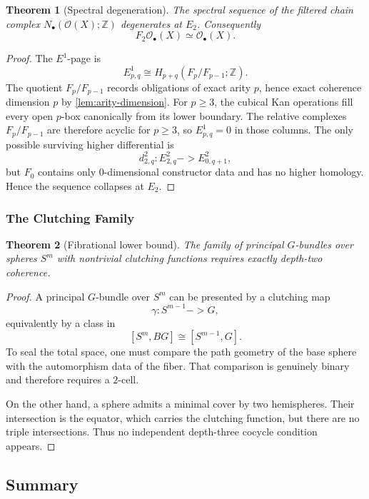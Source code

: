 \documentclass[11pt,a4paper]{article}
\def\to{->}%
\theoremstyle{plain}
\newtheorem{theorem}{Theorem}[section]
\theoremstyle{definition}
\theoremstyle{remark}
\newcommand{\Z}{\mathbb{Z}}
\newcommand{\Ocal}{\mathcal{O}}
\begin{document}
\begin{theorem}[Spectral degeneration]
\label{thm:spectral}
The spectral sequence of the filtered chain complex $N_\bullet(\Ocal(X);\Z)$ degenerates at $E_2$.  Consequently
\[
  F_2\Ocal_\bullet(X)\simeq \Ocal_\bullet(X).
\]
\end{theorem}

\begin{proof}
The $E^1$-page is
\[
  E^1_{p,q}\cong H_{p+q}(F_p/F_{p-1};\Z).
\]
The quotient $F_p/F_{p-1}$ records obligations of exact arity $p$, hence exact coherence dimension $p$ by \cref{lem:arity-dimension}.  For $p\ge 3$, the cubical Kan operations fill every open $p$-box canonically from its lower boundary.  The relative complexes $F_p/F_{p-1}$ are therefore acyclic for $p\ge 3$, so $E^1_{p,q}=0$ in those columns.  The only possible surviving higher differential is
\[
  d^2_{2,q}:E^2_{2,q}\to E^2_{0,q+1},
\]
but $F_0$ contains only $0$-dimensional constructor data and has no higher homology.  Hence the sequence collapses at $E_2$.
\end{proof}

\subsubsection{The Clutching Family}

\begin{theorem}[Fibrational lower bound]
\label{thm:clutching}
The family of principal $G$-bundles over spheres $S^m$ with nontrivial clutching functions requires exactly depth-two coherence.
\end{theorem}

\begin{proof}
A principal $G$-bundle over $S^m$ can be presented by a clutching map
\[
  \gamma:S^{m-1}\to G,
\]
equivalently by a class in
\[
  [S^m,BG]\cong [S^{m-1},G].
\]
To seal the total space, one must compare the path geometry of the base sphere with the automorphism data of the fiber.  That comparison is genuinely binary and therefore requires a $2$-cell.

On the other hand, a sphere admits a minimal cover by two hemispheres.  Their intersection is the equator, which carries the clutching function, but there are no triple intersections.  Thus no independent depth-three cocycle condition appears.
\end{proof}

\subsection{Summary}
\end{document}

